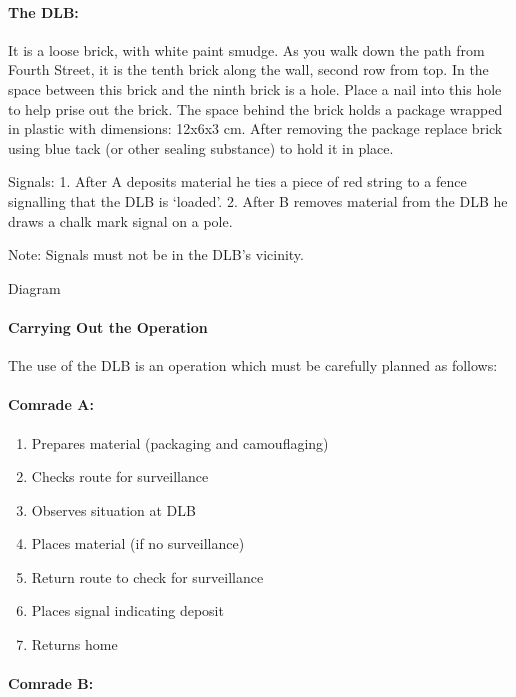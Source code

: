\paragraph{The DLB:}

It is a loose brick, with white paint smudge. As you walk down the path
from Fourth Street, it is the tenth brick along the wall, second row
from top. In the space between this brick and the ninth brick is a hole.
Place a nail into this hole to help prise out the brick. The space
behind the brick holds a package wrapped in plastic with dimensions:
12x6x3 cm. After removing the package replace brick using blue tack (or
other sealing substance) to hold it in place.

{Signals:} 1. After A deposits material he ties a piece of red string to
a fence signalling that the DLB is `loaded'. 2. After B removes material
from the DLB he draws a chalk mark signal on a pole.

Note: Signals must not be in the DLB's vicinity.

Diagram

\paragraph{Carrying Out the Operation}

The use of the DLB is an operation which must be carefully planned as
follows:

\paragraph{Comrade A:}

\begin{enumerate}
\tightlist
\item
  Prepares material (packaging and camouflaging)
\item
  Checks route for surveillance
\item
  Observes situation at DLB
\item
  Places material (if no surveillance)
\item
  Return route to check for surveillance
\item
  Places signal indicating deposit
\item
  Returns home
\end{enumerate}

\paragraph{Comrade B:}

